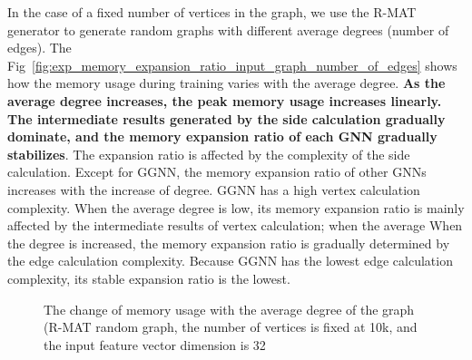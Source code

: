 In the case of a fixed number of vertices in the graph, we use the R-MAT generator to generate random graphs with different average degrees (number of edges).
The Fig~\ref{fig:exp_memory_expansion_ratio_input_graph_number_of_edges} shows how the memory usage during training varies with the average degree.
\textbf{As the average degree increases, the peak memory usage increases linearly.
The intermediate results generated by the side calculation gradually dominate, and the memory expansion ratio of each GNN gradually stabilizes}. 
The expansion ratio is affected by the complexity of the side calculation.
Except for GGNN, the memory expansion ratio of other GNNs increases with the increase of degree. GGNN has a high vertex calculation complexity.
When the average degree is low, its memory expansion ratio is mainly affected by the intermediate results of vertex calculation;
when the average When the degree is increased, the memory expansion ratio is gradually determined by the edge calculation complexity.
Because GGNN has the lowest edge calculation complexity, its stable expansion ratio is the lowest.

\begin{figure}
    \centering
    \caption{The change of memory usage with the average degree of the graph (R-MAT random graph, the number of vertices is fixed at 10k, and the input feature vector dimension is 32}
    \label{fig:exp_memory_expension_ratio_input_feature_dimension}
\end{figure}

